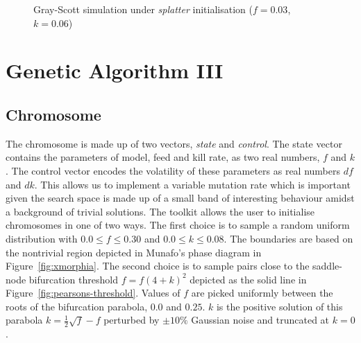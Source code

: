 \begin{figure}[!h]
            \hfill
            \caption{Gray-Scott simulation under \textit{splatter} initialisation ($f = 0.03$, $k = 0.06$)}
\label{fig:splatter}
\end{figure}

\section{Genetic Algorithm III} \label{sec:ga-3}

\subsection{Chromosome}
The chromosome is made up of two vectors, \textit{state} and \textit{control}. The state vector contains the parameters of model, feed and kill rate, as two real numbers, $f$ and $k$. The control vector encodes the volatility of these parameters as real numbers $df$ and $dk$. This allows us to implement a variable mutation rate which is important given the search space is made up of a small band of interesting behaviour amidst a background of trivial solutions. The toolkit allows the user to initialise chromosomes in one of two ways. The first choice is to sample a random uniform distribution with $0.0 \leq f \leq 0.30$ and $0.0 \leq k \leq 0.08$. The boundaries are based on the nontrivial region depicted in Munafo's phase diagram in Figure~\ref{fig:xmorphia}. The second choice is to sample pairs close to the saddle-node bifurcation threshold $f = f(4+k)^2$ depicted as the solid line in Figure~\ref{fig:pearsons-threshold}. Values of $f$ are picked uniformly between the roots of the bifurcation parabola, $0.0$ and $0.25$. $k$ is the positive solution of this parabola $k = \frac{1}{2}\sqrt{f} - f$ perturbed by $\pm 10\%$ Gaussian noise and truncated at $k = 0$.

